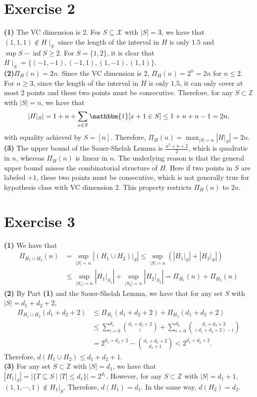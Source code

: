 \documentclass[11pt]{article}
\theoremstyle{plain}
\theoremstyle{definition}
\theoremstyle{remark}
\newcommand{\ind}{\mathbbm{1}}
\newcommand{\Z}{\mathbb{Z}}
\newcommand{\tuple}[1]{\left(#1\right)}
\newcommand{\tp}{\tuple}
\newcommand{\abs}[1]{\left\vert#1\right\vert}
\def\+#1{\mathcal{#1}} %
\begin{document}
\section*{Exercise 2}
\textbf{(1)} The VC dimension is $2$.
For $S\subseteq \+X$ with $|S| = 3$, we have that $(1,1,1)\notin H\mid_S$ since the length of the interval in $H$ is only $1.5$ and $\sup S - \inf S \geq 2$.
For $S = \{1,2\}$, it is clear that $H\mid_S = \{(-1,-1),(-1,1),(1,-1),(1,1)\}$.
\\\textbf{(2)}$\Pi_H(n) = 2n$.
Since the VC dimension is $2$, $\Pi_H(n) = 2^n = 2n$ for $n\leq 2$.
For $n\geq 3$, since the length of the interval in $H$ is only $1.5$, it can only cover at most $2$ points and these two points must be consecutive.
Therefore, for any $S \subset \Z$ with $|S| = n$, we have that  
$$
  \abs{H|_S} = 1 + n + \sum_{x\in S}\ind [x+1\in S] \leq 1 +n + n-1 = 2n,
$$
with equality achieved by $S = [n]$.
Therefore, $\Pi_H(n) = \max_{|S|=n} \abs{H|_S} = 2n$.
\\\textbf{(3)}
The upper bound of the Sauer-Shelah Lemma is $\frac{n^2+n+2}{2}$, which is quadratic in $n$, whereas $\Pi_H(n)$ is linear in $n$.
The underlying reason is that the general upper bound misses the combinatorial structure of $H$.
Here if two points in $S$ are labeled $+1$, these two points must be consecutive, which is not generally true for hypothesis class with VC dimension $2$.
This property restricts $\Pi_H(n)$ to $2n$.
\section*{Exercise 3}
\textbf{(1)}
We have that
\begin{align*}
  \Pi_{H_1\cup H_2}(n) &= \sup_{|S|=n}\abs{(H_1\cup H_2)|_S} \leq \sup_{|S|=n}\tp{\abs{H_1|_S} + \abs{H_2|_S}}
  \\&\leq \sup_{|S_1|=n}\abs{H_1|_{S_1}} + \sup_{|S_2|=n}\abs{H_2|_{S_2}} = \Pi_{H_1}(n) + \Pi_{H_2}(n)
\end{align*}
\textbf{(2)}
By Part \textbf{(1)} and the Sauer-Shelah Lemma, we have that for any set $S$ with $|S| = d_1+d_2+2$,
\begin{align*}
  \Pi_{H_1\cup H_2}(d_1+d_2+2) &\leq \Pi_{H_1}(d_1+d_2+2) + \Pi_{H_2}(d_1+d_2+2)
  \\&\leq \sum_{i=0}^{d_1} \binom{d_1+d_2+2}{i} + \sum_{i=0}^{d_2} \binom{d_1+d_2+2}{(d_1+d_2+2)-i}
  \\&= 2^{d_1+d_2+2}-\binom{d_1+d_2+2}{d_1+1}
  < 2^{d_1+d_2+2}.
\end{align*}
Therefore, $d(H_1\cup H_2)\leq d_1+d_2+1$.
\\\textbf{(3)}
For any set $S\subset \Z$ with $|S| = d_1$, we have that $\abs{H_1|_S} = |\{T\subseteq S\mid |T|\leq d_1\}| = 2^{d_1}$.
However, for any $S\subset \Z$ with $|S| = d_1 + 1$, $(1,1,\cdots,1)\notin H_1|_S$.
Therefore, $d(H_1) = d_1$.
In the same way, $d(H_2) = d_2$.
\end{document}
